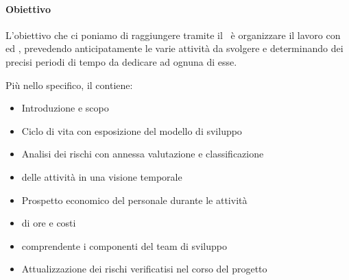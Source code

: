 			\paragraph{Obiettivo}
			L'obiettivo che ci poniamo di raggiungere tramite il \PdPd\ è organizzare il lavoro con  ed ,
			prevedendo anticipatamente le varie attività da svolgere e determinando dei precisi periodi di tempo da dedicare ad ognuna di esse.\par
			Più nello specifico, il \Doc{\PdPv} contiene:
			\begin{itemize}
				\item Introduzione e scopo
				\item Ciclo di vita con esposizione del modello di sviluppo
				\item Analisi dei rischi con annessa valutazione e classificazione
				\item {} delle attività in una visione temporale
				\item Prospetto economico del personale durante le attività
				\item {} di ore e costi
				\item {} comprendente i componenti del team di sviluppo
				\item Attualizzazione dei rischi verificatisi nel corso del progetto
			\end{itemize}

